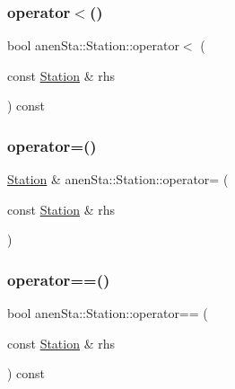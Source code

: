 \mbox{\label{classanen_sta_1_1_station_ae75bae686937d9b5fc9b75ca7f6133fc}} 
\subsubsection{\texorpdfstring{operator$<$()}{operator<()}}
{\footnotesize\ttfamily bool anen\+Sta\+::\+Station\+::operator$<$ (\begin{DoxyParamCaption}\item[{const \mbox{\hyperlink{classanen_sta_1_1_station}{Station}} \&}]{rhs }\end{DoxyParamCaption}) const}

\mbox{\label{classanen_sta_1_1_station_aefbe0460eb39098b3e1ed4b085ecefab}} 
\subsubsection{\texorpdfstring{operator=()}{operator=()}}
{\footnotesize\ttfamily \mbox{\hyperlink{classanen_sta_1_1_station}{Station}} \& anen\+Sta\+::\+Station\+::operator= (\begin{DoxyParamCaption}\item[{const \mbox{\hyperlink{classanen_sta_1_1_station}{Station}} \&}]{rhs }\end{DoxyParamCaption})}

\mbox{\label{classanen_sta_1_1_station_a402c117d0cff0994d195c2b7027f57c6}} 
\subsubsection{\texorpdfstring{operator==()}{operator==()}}
{\footnotesize\ttfamily bool anen\+Sta\+::\+Station\+::operator== (\begin{DoxyParamCaption}\item[{const \mbox{\hyperlink{classanen_sta_1_1_station}{Station}} \&}]{rhs }\end{DoxyParamCaption}) const}


